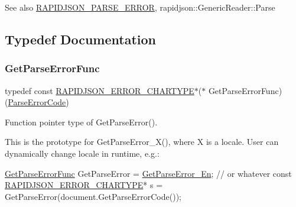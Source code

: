 \begin{DoxySeeAlso}{See also}
\hyperlink{group__RAPIDJSON__ERRORS_gae3689840fa6e89a241313f33b602f865}{R\+A\+P\+I\+D\+J\+S\+O\+N\+\_\+\+P\+A\+R\+S\+E\+\_\+\+E\+R\+R\+OR}, rapidjson\+::\+Generic\+Reader\+::\+Parse 
\end{DoxySeeAlso}


\subsection{Typedef Documentation}
\mbox{\label{group__RAPIDJSON__ERRORS_ga586548166441ab3ce30219cb35be2e04}} 
\subsubsection{\texorpdfstring{Get\+Parse\+Error\+Func}{GetParseErrorFunc}\hspace{0.1cm}{\footnotesize\ttfamily [1/2]}}
{\footnotesize\ttfamily typedef const \hyperlink{group__RAPIDJSON__ERRORS_ga7e4636fd48d0148f102b8a13f0539d8c}{R\+A\+P\+I\+D\+J\+S\+O\+N\+\_\+\+E\+R\+R\+O\+R\+\_\+\+C\+H\+A\+R\+T\+Y\+PE}$\ast$($\ast$ Get\+Parse\+Error\+Func) (\hyperlink{group__RAPIDJSON__ERRORS_ga8d4b32dfc45840bca189ade2bbcb6ba7}{Parse\+Error\+Code})}



Function pointer type of Get\+Parse\+Error(). 

This is the prototype for {\ttfamily Get\+Parse\+Error\+\_\+\+X()}, where {\ttfamily X} is a locale. User can dynamically change locale in runtime, e.\+g.\+: 
\begin{DoxyCode}
\hyperlink{group__RAPIDJSON__ERRORS_ga586548166441ab3ce30219cb35be2e04}{GetParseErrorFunc} GetParseError = \hyperlink{group__RAPIDJSON__ERRORS_ga28835eb93d2c3c07bbea13515eb31415}{GetParseError\_En}; \textcolor{comment}{// or whatever}
\textcolor{keyword}{const} \hyperlink{group__RAPIDJSON__ERRORS_ga7e4636fd48d0148f102b8a13f0539d8c}{RAPIDJSON\_ERROR\_CHARTYPE}* s = GetParseError(document.GetParseErrorCode());
\end{DoxyCode}
 \mbox{\label{group__RAPIDJSON__ERRORS_ga586548166441ab3ce30219cb35be2e04}} 
